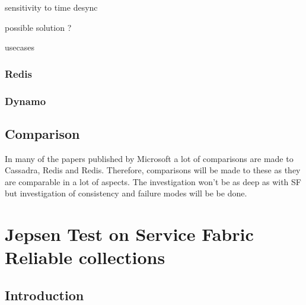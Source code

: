 \documentclass[a4paper,10pt,titlepage]{report}
\begin{document}
    sensitivity to time desync
    
    possible solution ?
    
    usecases
    
    

    \subsection{Redis}

    \subsection{Dynamo}


    \section{Comparison}
    In many of the papers published by Microsoft a lot of comparisons are made to Cassadra, Redis and Redis. Therefore, comparisons will be made to these as they are comparable in a lot of aspects. The investigation won't be as deep as with SF but investigation of consistency and failure modes will be be done.


    \chapter{Jepsen Test on Service Fabric Reliable collections}


    \section{Introduction}
\end{document}
